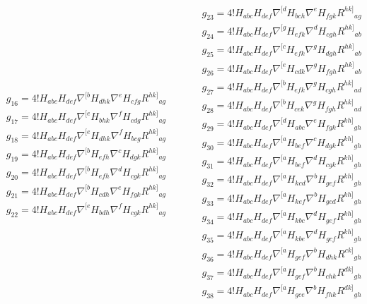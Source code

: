 \documentclass[a4paper,11pt]{article}
\begin{document}
\begin{equation}
\begin{aligned}
&g_{16}=4!H_{abc}H_{def}\nabla^{[b}H_{dhk}\nabla^eH_{cfg}R^{hk]}{}_{ag}\\
&g_{17}=4!H_{abc}H_{def}\nabla^{[e}H_{bhk}\nabla^fH_{cdg}R^{hk]}{}_{ag}\\
&g_{18}=4!H_{abc}H_{def}\nabla^{[e}H_{dhk}\nabla^fH_{bcg}R^{hk]}{}_{ag}\\
&g_{19}=4!H_{abc}H_{def}\nabla^{[b}H_{efh}\nabla^cH_{dgk}R^{hk]}{}_{ag}\\
&g_{20}=4!H_{abc}H_{def}\nabla^{[b}H_{efh}\nabla^dH_{cgk}R^{hk]}{}_{ag}\\
&g_{21}=4!H_{abc}H_{def}\nabla^{[b}H_{cdh}\nabla^eH_{fgk}R^{hk]}{}_{ag}\\
&g_{22}=4!H_{abc}H_{def}\nabla^{[e}H_{bdh}\nabla^fH_{cgk}R^{hk]}{}_{ag}
\end{aligned}
\qquad
\begin{aligned}
&g_{23}=4!H_{abc}H_{def}\nabla^{[d}H_{bch}\nabla^eH_{fgk}R^{hk]}{}_{ag}\\
&g_{24}=4!H_{abc}H_{def}\nabla^{[g}H_{efk}\nabla^dH_{cgh}R^{hk]}{}_{ab}\\
&g_{25}=4!H_{abc}H_{def}\nabla^{[c}H_{efk}\nabla^gH_{dgh}R^{hk]}{}_{ab}\\
&g_{26}=4!H_{abc}H_{def}\nabla^{[e}H_{cdk}\nabla^gH_{fgh}R^{hk]}{}_{ab}\\
%
&g_{27}=4!H_{abc}H_{def}\nabla^{[b}H_{efk}\nabla^gH_{cgh}R^{hk]}{}_{ad}\\
&g_{28}=4!H_{abc}H_{def}\nabla^{[b}H_{cek}\nabla^gH_{fgh}R^{hk]}{}_{ad}\\
&g_{29}=4!H_{abc}H_{def}\nabla^{[d}H_{abc}\nabla^eH_{fgk}R^{kh]}{}_{gh}\\
&g_{30}=4!H_{abc}H_{def}\nabla^{[a}H_{bef}\nabla^cH_{dgk}R^{kh]}{}_{gh}\\
&g_{31}=4!H_{abc}H_{def}\nabla^{[a}H_{bef}\nabla^dH_{cgk}R^{kh]}{}_{gh}\\
&g_{32}=4!H_{abc}H_{def}\nabla^{[a}H_{kcd}\nabla^bH_{gef}R^{kh]}{}_{gh}\\
&g_{33}=4!H_{abc}H_{def}\nabla^{[a}H_{kef}\nabla^bH_{gcd}R^{kh]}{}_{gh}\\
&g_{34}=4!H_{abc}H_{def}\nabla^{[a}H_{kbc}\nabla^dH_{gef}R^{kh]}{}_{gh}\\
&g_{35}=4!H_{abc}H_{def}\nabla^{[a}H_{kbe}\nabla^dH_{gcf}R^{kh]}{}_{gh}\\
&g_{36}=4!H_{abc}H_{def}\nabla^{[a}H_{gef}\nabla^bH_{dhk}R^{ck]}{}_{gh}\\
&g_{37}=4!H_{abc}H_{def}\nabla^{[a}H_{gef}\nabla^bH_{chk}R^{dk]}{}_{gh}\\
&g_{38}=4!H_{abc}H_{def}\nabla^{[a}H_{gce}\nabla^bH_{fhk}R^{dk]}{}_{gh}\\

\end{aligned}
\end{equation}
\end{document}

